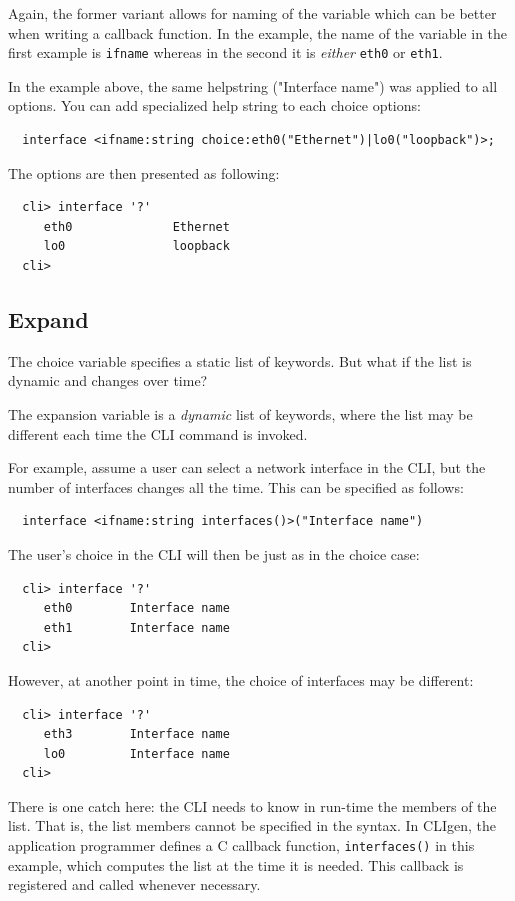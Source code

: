 \documentclass[a4paper, 10pt] {article}
\begin{document}
Again, the former variant allows for naming of the variable which can
be better when writing a callback function. In the example, the name
of the variable in the first example is {\tt ifname} whereas in the
second it is \emph{either} {\tt eth0} or {\tt eth1}.

In the example above, the same helpstring ("Interface name") was applied to all options.
You can add specialized help string to each choice options:
\begin{verbatim}
  interface <ifname:string choice:eth0("Ethernet")|lo0("loopback")>;
\end{verbatim}

The options are then presented as following:
\begin{verbatim}
  cli> interface '?'
     eth0              Ethernet
     lo0               loopback
  cli>
\end{verbatim}

\subsection{Expand}
\label{sec:expand1}
The choice variable specifies a static list of
keywords. But what if the list is dynamic and changes over time?

The expansion variable is a \emph{dynamic} list of keywords, where the
list may be different each time the CLI command is invoked.

For example, assume a user can select a network interface in the CLI,
but the number of interfaces changes all the time. This can be
specified as follows:

\begin{verbatim}
  interface <ifname:string interfaces()>("Interface name")
\end{verbatim}
The user's choice in the CLI will then be just as in the choice case:
\begin{verbatim}
  cli> interface '?'
     eth0        Interface name
     eth1        Interface name
  cli> 
\end{verbatim}

However, at another point in time, the choice of interfaces may be different:
\begin{verbatim}
  cli> interface '?'
     eth3        Interface name
     lo0         Interface name
  cli> 
\end{verbatim}

There is one catch here: the CLI needs to know in run-time the members
of the list. That is, the list members cannot be specified in the
syntax.  In CLIgen, the application programmer defines a C callback
function, {\tt interfaces()} in this example, which computes the list
at the time it is needed. This callback is registered and called
whenever necessary.
\end{document}
